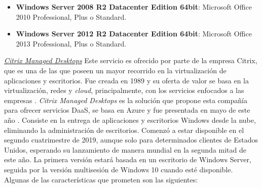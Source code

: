 \begin{itemize}
    \item \textbf{Windows Server 2008 R2 Datacenter Edition 64bit}: Microsoft Office 2010 Professional, Plus o Standard.
    
    \item \textbf{Windows Server 2012 R2 Datacenter Edition 64bit}: Microsoft Office 2013 Professional, Plus o Standard.
\end{itemize}

\clearpage

\noindent\underline{\textit{Citrix Managed Desktops}}\newline
\indent Este servicio es ofrecido por parte de la empresa Citrix, que es una de las que poseen un mayor recorrido en la virtualización de aplicaciones y escritorios. Fue creada en 1989 y su oferta de valor se basa en la virtualización, redes y \textit{cloud}, principalmente, con los servicios enfocados a las empresas \cite{citrixabout}. \textit{Citrix Managed Desktops} es la solución que propone esta compañía para ofrecer servicios \acs{DaaS}, se basa en Azure y fue presentada en mayo de este año \cite{kireetivalicherla2019}. Consiste en la entrega de aplicaciones y escritorios Windows desde la nube, eliminando la administración de escritorios. Comenzó a estar disponible en el segundo cuatrimestre de 2019, aunque solo para determinados clientes de Estados Unidos, esperando su lanzamiento de manera mundial en la segunda mitad de este año. La primera versión estará basada en un escritorio de Windows Server, seguida por la versión multisesión de Windows 10 cuando esté disponible. Algunas de las características que prometen son las siguientes:

